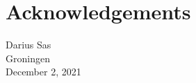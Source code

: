 \chapter*{Acknowledgements}

\begin{flushright}
Darius Sas\\
Groningen\\
December 2, 2021 %
\end{flushright}








